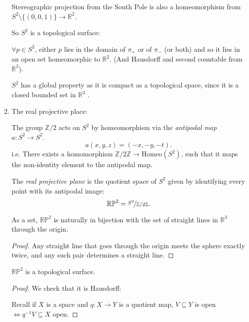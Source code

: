 \begin{example}
\begin{enumerate}
\begin{note}
            Stereographic projection from the South Pole is also a homeomorphism from \(S^2 \setminus \{(0,0,1)\} \to \mathbb{R}^2\). 
        \end{note}
        So \(S^2\) is a topological surface:

        \(\forall p \in S^2\), either \(p\) lies in the domain of \(\pi_+\) or of \(\pi_-\) (or both) and so it lies in an open set homeomorphic to \(\mathbb{R}^2\). (And Hausdorff and second countable from \(\mathbb{R}^2\)).
        \begin{remark}
            \(S^2\) has a global property as it is compact as a topological space, since it is a closed bounded set in \(\mathbb{R}^3\) .
        \end{remark}
        \item The real projective place:
        
        The group \(\mathbb{Z} / 2\) acts on \(S^2\) by homeomorphism via the \textit{antipodal map} \(a: S^2 \to S^2\).
        \[
            a(x,y,z) = (-x,-y,-t).
        \]
        i.e. There exists a homomorphism \(\mathbb{Z} / 2\mathbb{Z} \to  \mathrm{Homeo} (S^2)\), such that it maps the non-identity element to the antipodal map.

        \begin{definition}{}{}
            The \textit{real projective plane} is the quotient space of \(S^2\) given by identifying every point with its antipodal image:
            \[
                \mathbb{RP}^2 = \nicefrac{S^2}{\mathbb{Z}/ 2\mathbb{Z}}.
            \]
        \end{definition}

        \begin{lemma}{}{}
            As a set, \(\mathbb{RP}^2\) is naturally in bijection with the set of straight lines in \(\mathbb{R}^3\) through the origin.
        \end{lemma}
        \begin{proof}
             Any straight line that goes through the origin meets the sphere exactly twice, and any such pair determines a straight line.
        \end{proof}
        \begin{lemma}{}{}
            \(\mathbb{RP}^2\) is a topological surface.
        \end{lemma}
        \begin{proof}
            We check that it is Hausdorff:

            Recall if \(X\) is a space and \(q: X \to Y\) is a quotient map, \(V \subseteq Y\) is open \(\iff q^{-1}V \subseteq X\) open. 


\end{proof}
\end{enumerate}
\end{example}
